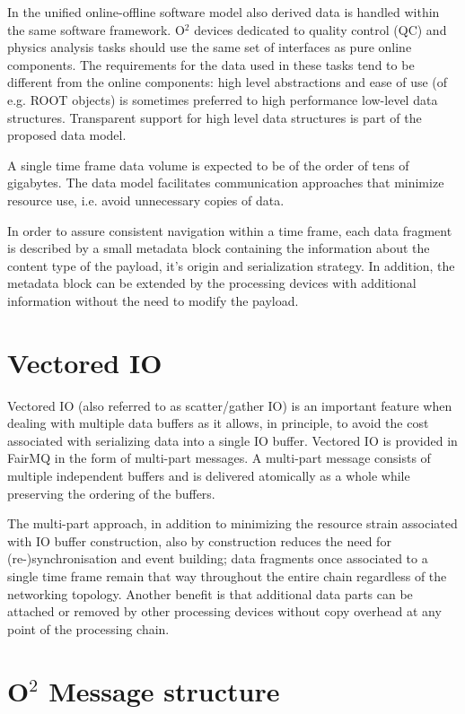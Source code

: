 \documentclass[a4paper,twoside]{article}
\def\O2{O$^2$}
\begin{document}
In the unified online-offline software model also derived data is handled within the same software framework. \O2 devices dedicated to quality control (QC) and physics analysis tasks should use the same set of interfaces as pure online components. The requirements for the data used in these tasks tend to be different from the online components: high level abstractions and ease of use (of e.g. ROOT\cite{root} objects) is sometimes preferred to high performance low-level data structures. Transparent support for high level data structures is part of the proposed data model.

A single time frame data volume is expected to be of the order of tens of gigabytes. The data model facilitates communication approaches that minimize resource use, i.e. avoid unnecessary copies of data.

In order to assure consistent navigation within a time frame, each data fragment is described by a small metadata block containing the information about the content type of the payload, it's origin and serialization strategy.
In addition, the metadata block can be extended by the processing devices with additional information without the need to modify the payload.

\section{Vectored IO}

Vectored IO (also referred to as scatter/gather IO) is an important feature when dealing with multiple data buffers as it allows, in principle, to avoid the cost associated with serializing data into a single IO buffer.
Vectored IO is provided in FairMQ in the form of multi-part messages. A multi-part message consists of multiple independent buffers and is delivered atomically as a whole while preserving the ordering of the buffers.

The multi-part approach, in addition to minimizing the resource strain associated with IO buffer construction, also by construction reduces the need for (re-)synchronisation and event building; data fragments once associated to a single time frame remain that way throughout the entire chain regardless of the networking topology. Another benefit is that additional data parts can be attached or removed by other processing devices without copy overhead at any point of the processing chain.

\section{\O2 Message structure}
\end{document}
